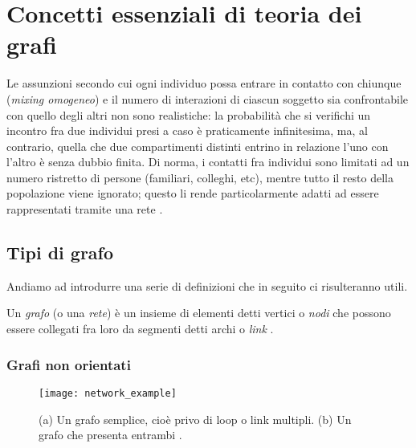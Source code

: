 \chapter{Concetti essenziali di teoria dei grafi}
\label{chap:cap2}

Le assunzioni secondo cui ogni individuo possa entrare in contatto con chiunque (\emph{mixing omogeneo}) e il numero di interazioni di ciascun soggetto sia confrontabile con quello degli altri non sono realistiche: la probabilità che si verifichi un incontro fra due individui presi a caso è praticamente infinitesima, ma, al contrario, quella che due compartimenti distinti entrino in relazione l'uno con l'altro è senza dubbio finita. Di norma, i contatti fra individui sono limitati ad un numero ristretto di persone (familiari, colleghi, etc), mentre tutto il resto della popolazione viene ignorato; questo li rende particolarmente adatti ad essere rappresentati tramite una rete \cite{Barabasi}. 
\section{Tipi di grafo}
Andiamo ad introdurre una serie di definizioni che in seguito ci risulteranno utili.
\begin{definizione}
Un \emph{grafo} (o una \emph{rete}) è un insieme di elementi detti vertici o \emph{nodi} che possono essere collegati fra loro da segmenti detti archi o \emph{link} \cite{Bickle}.
\end{definizione}
\subsection{Grafi non orientati}
\begin{figure}
		\begin{center}
			\texttt{[image: network\_example]}
			\caption{(a) Un grafo semplice, cioè privo di loop o link multipli. (b) Un grafo che presenta entrambi \cite{Newman}.}
			\label{fig:net_ex}
		\end{center}
	\end{figure}
	
